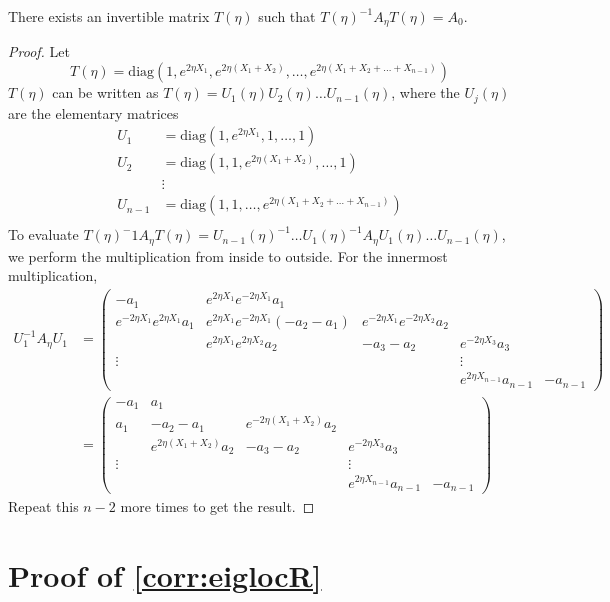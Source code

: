 \documentclass[thesis.tex]{subfiles}
\begin{document}
\begin{lemma}\label{lemma:Aetaconj}
There exists an invertible matrix $T(\eta)$ such that $T(\eta)^{-1} A_\eta T(\eta) = A_0$.
\begin{proof}
Let 
\[
T(\eta) = \text{diag}(1, e^{2 \eta X_1}, e^{2 \eta (X_1 + X_2)}, \dots, e^{2 \eta (X_1 + X_2 + \dots + X_{n-1})})
\]
$T(\eta)$ can be written as $T(\eta) = U_1(\eta) U_2(\eta) \dots U_{n-1}(\eta)$, where the $U_j(\eta)$ are the elementary matrices
\begin{align*}
U_1 &= \text{diag}(1, e^{2 \eta X_1}, 1, \dots, 1) \\
U_2 &= \text{diag}(1, 1, e^{2 \eta (X_1 + X_2)}, \dots, 1) \\
&\vdots \\
U_{n-1} &= \text{diag}(1, 1, \dots, e^{2 \eta (X_1 + X_2 + \dots + X_{n-1})}) \\
\end{align*}
To evaluate $T(\eta)^-1 A_\eta T(\eta) = U_{n-1}(\eta)^{-1} \dots U_1(\eta)^{-1} A_\eta U_1(\eta) \dots U_{n-1}(\eta)$, we perform the multiplication from inside to outside. For the innermost multiplication,
\begin{align*}
U_1^{-1} A_\eta U_1 &= \begin{pmatrix}
-a_1 & e^{2 \eta X_1} e^{-2 \eta X_1} a_1 \\
e^{-2 \eta X_1} e^{2 \eta X_1} a_1 & e^{2 \eta X_1} e^{-2 \eta X_1}(-a_2 - a_1) & e^{-2 \eta X_1}e^{-2 \eta X_2} a_2 \\
& e^{2 \eta X_1} e^{2 \eta X_2} a_2 & -a_3 - a_2 & e^{-2 \eta X_3} a_3 \\
\vdots & & & \vdots \\
& & & e^{2 \eta X_{n-1}} a_{n-1} & -a_{n-1} 
\end{pmatrix}\\
&= \begin{pmatrix}
-a_1 & a_1 \\
a_1 & -a_2 - a_1 & e^{-2 \eta (X_1+X_2)} a_2 \\
& e^{2 \eta (X_1+X_2)} a_2 & -a_3 - a_2 & e^{-2 \eta X_3} a_3 \\
\vdots & & & \vdots \\
& & & e^{2 \eta X_{n-1}} a_{n-1} & -a_{n-1} 
\end{pmatrix}
\end{align*}
Repeat this $n-2$ more times to get the result.
\end{proof}
\end{lemma}

\section{Proof of \cref{corr:eiglocR}}
\end{document}
